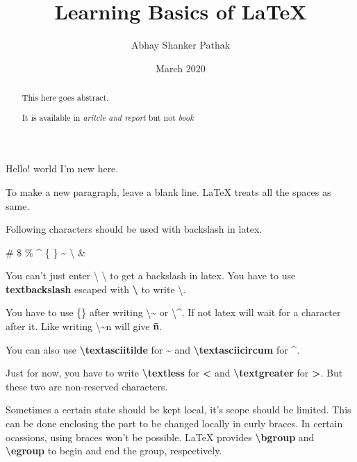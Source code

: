 \documentclass[12pt,a4paper,oneside]{article}
\begin{document}

\title{Learning Basics of {\LaTeX}}
\author{Abhay Shanker Pathak}
\date{March 2020}
\maketitle	%

\renewcommand{\abstractname}{New Abstract}

\begin{abstract}
	This here goes abstract.

	It is available in \textit{aritcle and report} but not \textit{book}
\end{abstract}

\tableofcontents
\vfill	%
\clearpage

\setlength{\parindent}{1cm}

Hello! world
I'm new here.

To make a new paragraph, leave a blank line. {\LaTeX} treats all the spaces as same.

Following characters should be used with backslash in latex.

\# \$ \% \^{} \{ \} \~{} \textbackslash{} \&

You can't just enter \textbackslash{} \textbackslash{} to get a backslash in latex. You have to use \textbf{textbackslash{}} escaped with \textbf{\textbackslash{}} to write \textbackslash{}.

You have to use \{\} after writing \textbackslash{}\~{} or \textbackslash{}\^{}. If not latex will wait for a character after it. Like writing \textbackslash{}\~{}n will give \textbf{\~n}.

You can also use \textbf{\textbackslash{}textasciitilde} for \textbf{\textasciitilde} and \textbf{\textbackslash{}textasciicircum} for \textbf{\textasciicircum}.

Just for now, you have to write \textbf{\textbackslash{}textless} for \textbf{\textless} and \textbf{\textbackslash{}textgreater} for \textbf{\textgreater}. But these two are non-reserved characters.

Sometimes a certain state should be kept local, it's scope should be limited. This can be done enclosing the part to be changed locally in curly braces. In certain ocassions, using braces won't be possible. {\LaTeX} provides \textbf{\textbackslash{}bgroup} and \textbf{\textbackslash{}egroup} to begin and end the group, respectively.
\end{document}

